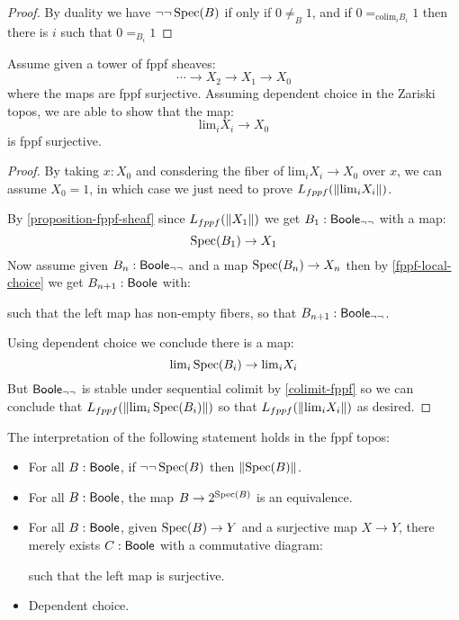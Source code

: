 \begin{proof}
By duality we have $\neg\neg\operatorname{Spec}(B)$ if only if $0\not=_B1$, and if $0=_{\mathrm{colim}_iB_i}1$ then there is $i$ such that $0=_{B_i}1$
\end{proof}

\begin{lemma}\label{dependent-choice-fppf}
Assume given a tower of fppf sheaves:
\[\cdots \to X_2\to X_1 \to X_0 \]
where the maps are fppf surjective. Assuming dependent choice in the Zariski topos, we are able to show that the map:
\[\mathrm{lim}_i X_i\to X_0\]
is fppf surjective.
\end{lemma}

\begin{proof}
By taking $x:X_0$ and consdering the fiber of $\mathrm{lim}_i X_i\to X_0$ over $x$, we can assume $X_0=1$, in which case we just need to prove $L_{fppf}(\lVert \mathrm{lim}_iX_i \rVert)$.

By \cref{proposition-fppf-sheaf} since $L_{fppf}(\lVert X_1 \rVert)$ we get $B_1:\mathsf{Boole}_{\neg\neg}$ with a map:
\[\operatorname{Spec}(B_1)\to X_1\]
Now assume given $B_n:\mathsf{Boole}_{\neg\neg}$ and a map $\operatorname{Spec}(B_n)\to X_n$ then by \cref{fppf-local-choice} we get $B_{n+1}:\mathsf{Boole}$ with:
\begin{center}
\end{center}
such that the left map has non-empty fibers, so that $B_{n+1}:\mathsf{Boole}_{\neg\neg}$.

Using dependent choice we conclude there is a map:
\[\mathrm{lim}_i\operatorname{Spec}(B_i) \to \mathrm{lim}_iX_i\]
But $\mathsf{Boole}_{\neg\neg}$ is stable under sequential colimit by \cref{colimit-fppf} so we can conclude that $L_{fppf}(\lVert \mathrm{lim}_i\operatorname{Spec}(B_i) \rVert)$ so that $L_{fppf}(\lVert \mathrm{lim}_iX_i \rVert)$ as desired.
\end{proof}

\begin{theorem}
The interpretation of the following statement holds in the fppf topos:
\begin{itemize}
\item For all $B:\mathsf{Boole}$, if $\neg\neg\operatorname{Spec}(B)$ then $\lVert \operatorname{Spec}(B) \rVert$.
\item For all $B:\mathsf{Boole}$, the map $B\to {2}^{\operatorname{Spec}(B)}$ is an equivalence.
\item For all $B:\mathsf{Boole}$, given $\operatorname{Spec}(B)\to Y$ and a surjective map $X\to Y$, there merely exists $C:\mathsf{Boole}$ with a commutative diagram:
\begin{center}
\end{center}
such that the left map is surjective.
\item Dependent choice.
\end{itemize}
\end{theorem}

